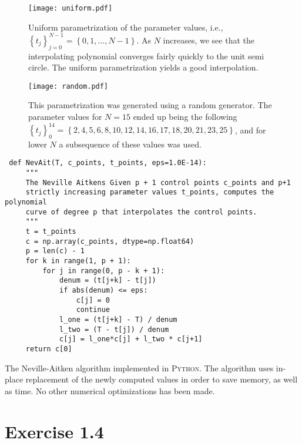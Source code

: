 \documentclass[12pt, article, oneside]{memoir}
\begin{document}
    \begin{figure}[tbp]
        \centering
        \texttt{[image: uniform.pdf]}
        \caption{Uniform parametrization of the parameter values, i.e.,
            \(\left\{ t_j \right\}_{j=0}^{N-1} = \left\{ 0, 1, \ldots, N-1
            \right\}\). As \(N\) increases, we see that the interpolating
            polynomial converges fairly quickly to the unit semi circle. The
            uniform parametrization yields a good interpolation.}
        \label{fig:uniform}
    \end{figure}

    \begin{figure}[tpb]
        \centering
        \texttt{[image: random.pdf]}
        \caption{This parametrization was generated using a random generator.
            The parameter values for \(N = 15\) ended up being the following 
            \(\left\{t_j\right\}_{0}^{14} = \left\{2, 4,  5,  6, 8, 10, 12, 14,
            16, 17, 18, 20, 21, 23, 25\right\}\), and for lower \(N\) a
            subsequence of these values was used.}
        \label{fig:random}
    \end{figure}

    \begin{listing}[tbp]
     \begin{verbatim}
 def NevAit(T, c_points, t_points, eps=1.0E-14):
     """
     The Neville Aitkens Given p + 1 control points c_points and p+1
     strictly increasing parameter values t_points, computes the polynomial
     curve of degree p that interpolates the control points.
     """
     t = t_points
     c = np.array(c_points, dtype=np.float64)
     p = len(c) - 1
     for k in range(1, p + 1):
         for j in range(0, p - k + 1):
             denum = (t[j+k] - t[j]) 
             if abs(denum) <= eps:
                 c[j] = 0
                 continue
             l_one = (t[j+k] - T) / denum
             l_two = (T - t[j]) / denum
             c[j] = l_one*c[j] + l_two * c[j+1]
     return c[0]
     \end{verbatim}
     \caption{The Neville-Aitken algorithm implemented in \textsc{Python}. The
         algorithm uses in-place replacement of the newly computed values in
         order to save memory, as well as time. No other numerical optimizations
     has been made.}
     \label{lst:nev_ait}
     \end{listing}

\chapter*{Exercise 1.4}
\label{cha:exercise_1_4}
     
\end{document}
